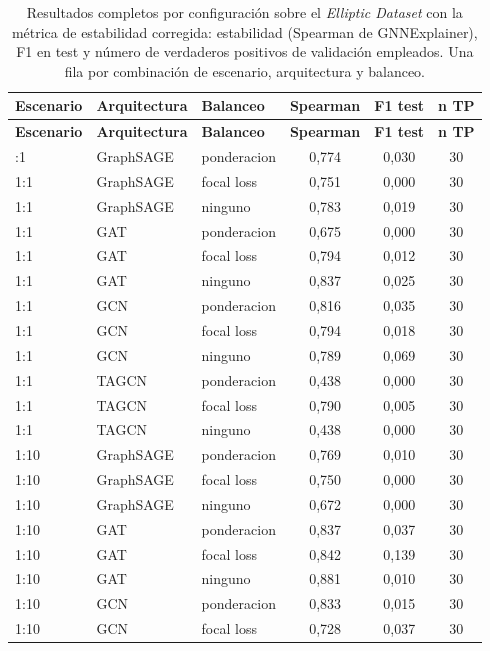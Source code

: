 \begin{longtable}{lllccc}
\caption{Resultados completos por configuración sobre el \textit{Elliptic Dataset} con la métrica de estabilidad corregida: estabilidad (Spearman de GNNExplainer), F1 en test y número de verdaderos positivos de validación empleados. Una fila por combinación de escenario, arquitectura y balanceo.}\label{tab:elliptic-full}\\
\toprule
\textbf{Escenario} & \textbf{Arquitectura} & \textbf{Balanceo} & \textbf{Spearman} & \textbf{F1 test} & \textbf{n TP} \\
\midrule
\endfirsthead
\toprule
\textbf{Escenario} & \textbf{Arquitectura} & \textbf{Balanceo} & \textbf{Spearman} & \textbf{F1 test} & \textbf{n TP} \\
\midrule
\endhead
\bottomrule
\endfoot
1:1 & GraphSAGE & ponderacion & 0,774 & 0,030 & 30 \\
1:1 & GraphSAGE & focal loss & 0,751 & 0,000 & 30 \\
1:1 & GraphSAGE & ninguno & 0,783 & 0,019 & 30 \\
1:1 & GAT & ponderacion & 0,675 & 0,000 & 30 \\
1:1 & GAT & focal loss & 0,794 & 0,012 & 30 \\
1:1 & GAT & ninguno & 0,837 & 0,025 & 30 \\
1:1 & GCN & ponderacion & 0,816 & 0,035 & 30 \\
1:1 & GCN & focal loss & 0,794 & 0,018 & 30 \\
1:1 & GCN & ninguno & 0,789 & 0,069 & 30 \\
1:1 & TAGCN & ponderacion & 0,438 & 0,000 & 30 \\
1:1 & TAGCN & focal loss & 0,790 & 0,005 & 30 \\
1:1 & TAGCN & ninguno & 0,438 & 0,000 & 30 \\
1:10 & GraphSAGE & ponderacion & 0,769 & 0,010 & 30 \\
1:10 & GraphSAGE & focal loss & 0,750 & 0,000 & 30 \\
1:10 & GraphSAGE & ninguno & 0,672 & 0,000 & 30 \\
1:10 & GAT & ponderacion & 0,837 & 0,037 & 30 \\
1:10 & GAT & focal loss & 0,842 & 0,139 & 30 \\
1:10 & GAT & ninguno & 0,881 & 0,010 & 30 \\
1:10 & GCN & ponderacion & 0,833 & 0,015 & 30 \\
1:10 & GCN & focal loss & 0,728 & 0,037 & 30 \\

\end{longtable}
